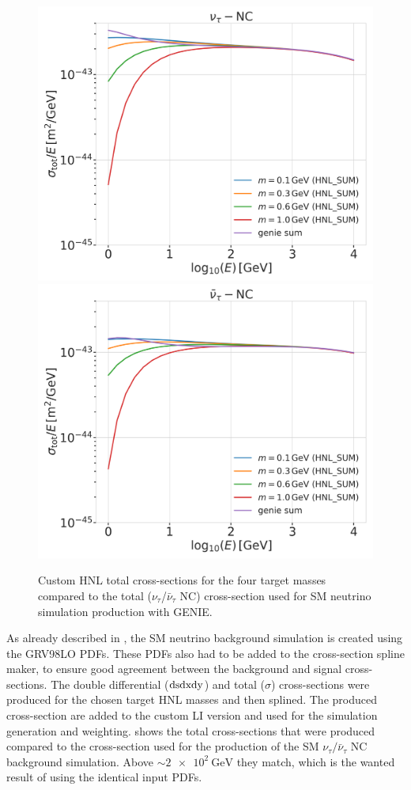 \begin{figure}[h]
    \includegraphics[width=.49\linewidth]{figures/hnl_simulation/cross_sections/custom_HNL_xsecs_final_SUM_flavorwise_total_xsecs_sigma-nutau-N-nc.png}
    \includegraphics[width=.49\linewidth]{figures/hnl_simulation/cross_sections/custom_HNL_xsecs_final_SUM_flavorwise_total_xsecs_sigma-nutaubar-N-nc.png}
    \caption{Custom HNL total cross-sections for the four target masses compared to the total ($\nu_\tau$/$\bar{\nu}_\tau$ NC) cross-section used for SM neutrino simulation production with GENIE.}
\end{figure}

As already described in , the SM neutrino background simulation is created using the GRV98LO PDFs. These PDFs also had to be added to the cross-section spline maker, to ensure good agreement between the background and signal cross-sections. The double differential ($\rm{d}s\rm{d}x\rm{d}y$) and total ($\sigma$) cross-sections were produced for the chosen target HNL masses and then splined. The produced cross-section are added to the custom LI version and used for the simulation generation and weighting.  shows the total cross-sections that were produced compared to the cross-section used for the production of the SM $\nu_\tau/\bar{\nu}_\tau$ NC background simulation. Above $\sim\SI{2e2}{\GeV}$ they match, which is the wanted result of using the identical input PDFs.


